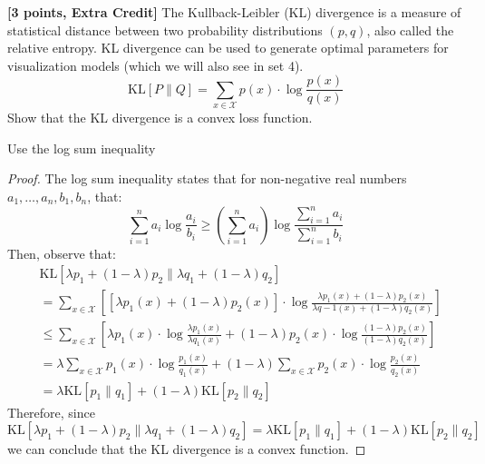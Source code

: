 \problem\textbf{[3 points, Extra Credit] }
The Kullback-Leibler (KL) divergence is a measure of statistical distance between two probability distributions $(p, q)$, also called the relative entropy. KL divergence can be used to generate optimal parameters for visualization models (which we will also see in set 4).
\[\mathrm{KL}[P\|Q] = \sum_{x\in\mathcal{X}} p(x) \cdot \log \frac{p(x)}{q(x)}\]
Show that the KL divergence is a convex loss function. \\

\begin{hint}
    Use the log sum inequality
\end{hint}

\begin{solution}
\begin{proof}
The log sum inequality states that for non-negative real numbers $a_1, \dots, a_n, b_1, b_n$, that:
\[\sum_{i=1}^n a_i \log \frac{a_i}{b_i} \geq \left(\sum_{i=1}^n a_i\right)\log \frac{\sum_{i=1}^n a_i}{\sum_{i=1}^n b_i}\]
 Then, observe that:
 \begin{align*}
     &\mathrm{KL}[\lambda p_1 + (1-\lambda)p_2 \| \lambda q_1 + (1-\lambda)q_2] \\
     &= \sum_{x\in \mathcal{X}} \left[[\lambda p_1(x) + (1-\lambda) p_2(x)] \cdot \log \frac{\lambda p_1 (x) + (1-\lambda) p_2 (x)}{\lambda q-1 (x) + (1-\lambda) q_2(x)}\right] \\
     &\leq \sum_{x\in \mathcal{X}} \left[\lambda p_1(x) \cdot \log \frac{\lambda p_1(x)}{\lambda q_1 (x)}+ (1-\lambda) p_2(x) \cdot \log \frac{(1-\lambda) p_2 (x)}{(1-\lambda) q_2(x)}\right] \\
     &= \lambda \sum_{x\in \mathcal{X}} p_1(x) \cdot \log \frac{ p_1(x)}{q_1 (x)} + (1-\lambda)\sum_{x\in\mathcal{X}} p_2(x) \cdot \log \frac{p_2 (x)}{q_2(x)} \\
     &= \lambda \mathrm{KL}[p_1 \| q_1] + (1-\lambda)\mathrm{KL}[p_2 \| q_2]
 \end{align*}
 Therefore, since 
 \[\mathrm{KL}[\lambda p_1 + (1-\lambda)p_2 \| \lambda q_1 + (1-\lambda)q_2] = \lambda \mathrm{KL}[p_1 \| q_1] + (1-\lambda)\mathrm{KL}[p_2 \| q_2]\]
 we can conclude that the KL divergence is a convex function.
 \qedhere
\end{proof}
\end{solution}
